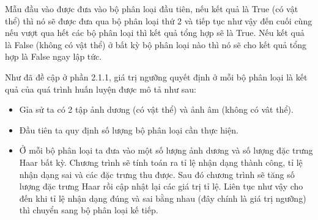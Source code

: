 \documentclass[12pt,a4paper]{article}
\begin{document}
Mẫu đầu vào được đưa vào bộ phân loại đầu tiên, nếu kết quả là True (có vật thể) thì nó sẽ được đưa qua bộ phân loại thứ 2 và tiếp tục như vậy đến cuối cùng nếu vượt qua hết các bộ phân loại thì kết quả tổng hợp sẽ là True. Nếu kết quả là False (không có vật thể) ở bất kỳ bộ phân loại nào thì nó sẽ cho kết quả tổng hợp là False ngay lập tức.

Như đã đề cập ở phần 2.1.1, giá trị ngưỡng quyết định ở mỗi bộ phân loại là kết quả của quá trình huấn luyện được mô tả như sau:
\begin{itemize}
\item Gỉa sử ta có 2 tập ảnh dương (có vật thể) và ảnh âm (không có vât thể).
\item Đầu tiên ta quy định số lượng bộ phân loại cần thực hiện.
\item Ở mỗi bộ phân loại ta đưa vào một số lượng ảnh dương và số lượng đặc trưng Haar bất kỳ. Chương trình sẽ tính toán ra tỉ lệ nhận dạng thành công, tỉ lệ nhận dạng sai và các đặc trưng thu được. Sau đó chương trình sẽ tăng số lượng đặc trưng Haar rồi cập nhật lại các giá trị tỉ lệ. Liên tục như vậy cho đến khi tỉ lệ nhận dạng đúng và sai bằng nhau (đây chính là giá trị ngưỡng) thì chuyển sang bộ phân loại kế tiếp.
\end{itemize} 
\pagebreak
\end{document}
